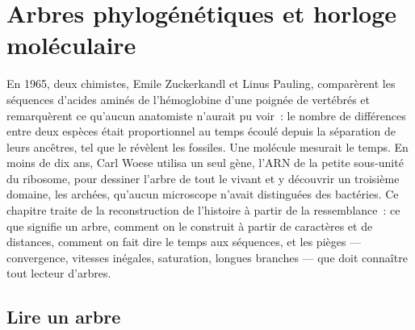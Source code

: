 \chapter{Arbres phylogénétiques et horloge moléculaire}\label{ch:b2:phylogenetic-trees}

En 1965, deux chimistes, Emile Zuckerkandl et Linus Pauling, comparèrent
les séquences d'acides aminés de l'hémoglobine d'une poignée de
vertébrés et remarquèrent ce qu'aucun anatomiste n'aurait pu voir~: le
nombre de différences entre deux espèces était proportionnel au temps
écoulé depuis la séparation de leurs ancêtres, tel que le révèlent les
fossiles. Une molécule mesurait le temps. En moins de dix ans, Carl Woese
utilisa un seul gène, l'ARN de la petite sous-unité du ribosome, pour
dessiner l'arbre de tout le vivant et y découvrir un troisième domaine,
les archées, qu'aucun microscope n'avait distinguées des bactéries. Ce
chapitre traite de la reconstruction de l'histoire à partir de la
ressemblance~: ce que signifie un arbre, comment on le construit à partir
de caractères et de distances, comment on fait dire le temps aux
séquences, et les pièges --- convergence, vitesses inégales, saturation,
longues branches --- que doit connaître tout lecteur d'arbres.

\section{Lire un arbre}

